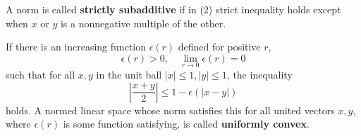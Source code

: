 \documentclass[12pt, oneside]{book}
\begin{document}
\begin{definition}
    A norm is called \textbf{strictly subadditive} if in (2) strict inequality holds except when $x$ or $y$ is a nonnegative multiple of the other.
\end{definition}

\begin{definition}
    If there is an increasing function $\epsilon(r)$ defined for positive $r$,
    \begin{equation*}
        \epsilon(r)>0, \quad \lim _{r \rightarrow 0} \epsilon(r)=0
    \end{equation*}
    such that for all $x, y$ in the unit ball $|x| \leq 1,|y| \leq 1$, the inequality
    \begin{equation*}
        \left|\frac{x+y}{2}\right| \leq 1-\epsilon(|x-y|)
    \end{equation*}
    holds. A normed linear space whose norm satisfies this for all united vectors $x, y$, where $\epsilon(r)$ is some function satisfying, is called \textbf{uniformly convex}.


\end{definition}
\end{document}
